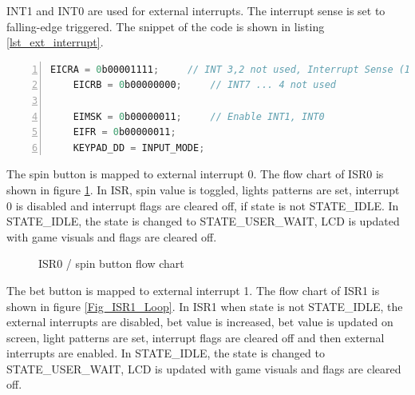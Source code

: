 \documentclass[a4paper,13pt,openany,sffamily]{memoir}
\begin{document}
\clearpage
INT1 and INT0 are used for external interrupts. The interrupt sense is set to falling-edge triggered. The snippet of the code is shown in listing \ref{lst_ext_interrupt}.
\begin{lstlisting}[numbers=left,breaklines=true,caption={External interrupts initialization },label={lst_ext_interrupt},language=C]
	EICRA = 0b00001111;		// INT 3,2 not used, Interrupt Sense (INT1, INT0) falling-edge triggered
	EICRB = 0b00000000;		// INT7 ... 4 not used
	
	EIMSK = 0b00000011;		// Enable INT1, INT0
	EIFR = 0b00000011;
    KEYPAD_DD = INPUT_MODE;
\end{lstlisting}
The spin button is mapped to external interrupt 0.  The flow chart of ISR0 is shown in figure \ref{Fig_ISR0_Loop}. In ISR, spin value is toggled, lights patterns are set, interrupt 0 is disabled and interrupt flags are cleared off, if state is not STATE\_IDLE. In STATE\_IDLE, the state is changed to STATE\_USER\_WAIT, LCD is updated with game visuals and flags are cleared off. 


\begin{figure}[h]
\caption{ISR0 / spin button flow chart }
\label{Fig_ISR0_Loop}
\end{figure}


\clearpage

 The bet button is mapped to external interrupt 1. The flow chart of ISR1 is shown in figure \ref{Fig_ISR1_Loop}. In ISR1 when state is not STATE\_IDLE, the external interrupts are disabled, bet value is increased, bet value is updated on screen, light patterns are set, interrupt flags are cleared off and then external interrupts are enabled. In STATE\_IDLE, the state is changed to STATE\_USER\_WAIT, LCD is updated with game visuals and flags are cleared off.    
\end{document}
